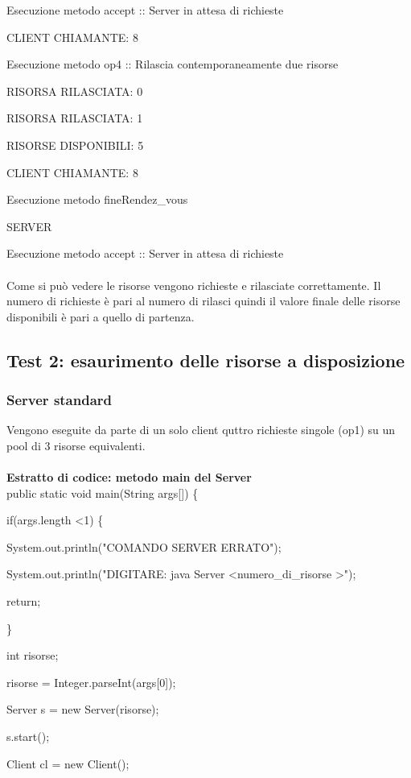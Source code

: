 \documentclass[10pt, a4paper]{article}
\begin{document}
Esecuzione metodo accept :: Server in attesa di richieste

CLIENT CHIAMANTE: 8

Esecuzione metodo op4 :: Rilascia contemporaneamente due risorse

RISORSA RILASCIATA: 0

RISORSA RILASCIATA: 1

RISORSE DISPONIBILI: 5

CLIENT CHIAMANTE: 8

Esecuzione metodo fineRendez\_vous

SERVER

Esecuzione metodo accept :: Server in attesa di richieste
\\\\
Come si può vedere le risorse vengono richieste e rilasciate correttamente. Il numero di richieste è pari al numero di rilasci quindi il valore finale delle risorse disponibili è pari a quello di partenza.
\subsection{Test 2: esaurimento delle risorse a disposizione}
\subsubsection{Server standard}
Vengono eseguite da parte di un solo client quttro richieste singole (op1) su un pool di 3 risorse equivalenti.
\\\\
\textbf{Estratto di codice: metodo main del Server}
\\

public static void main(String args[]) \{

        if(args.length \textless 1) \{

            System.out.println("COMANDO SERVER ERRATO");

            System.out.println("DIGITARE: java Server \textless numero\_di\_risorse \textgreater");

            return;

        \}

        int risorse;

        risorse = Integer.parseInt(args[0]);

        Server s = new Server(risorse);

        s.start();

	Client cl = new Client();
\end{document}

